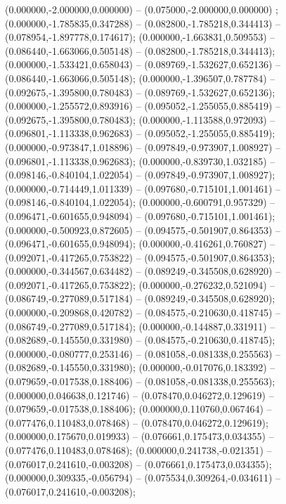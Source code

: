  (0.000000,-2.000000,0.000000) -- (0.075000,-2.000000,0.000000) ;
 (0.000000,-1.785835,0.347288) -- (0.082800,-1.785218,0.344413) -- (0.078954,-1.897778,0.174617);
 (0.000000,-1.663831,0.509553) -- (0.086440,-1.663066,0.505148) -- (0.082800,-1.785218,0.344413);
 (0.000000,-1.533421,0.658043) -- (0.089769,-1.532627,0.652136) -- (0.086440,-1.663066,0.505148);
 (0.000000,-1.396507,0.787784) -- (0.092675,-1.395800,0.780483) -- (0.089769,-1.532627,0.652136);
 (0.000000,-1.255572,0.893916) -- (0.095052,-1.255055,0.885419) -- (0.092675,-1.395800,0.780483);
 (0.000000,-1.113588,0.972093) -- (0.096801,-1.113338,0.962683) -- (0.095052,-1.255055,0.885419);
 (0.000000,-0.973847,1.018896) -- (0.097849,-0.973907,1.008927) -- (0.096801,-1.113338,0.962683);
 (0.000000,-0.839730,1.032185) -- (0.098146,-0.840104,1.022054) -- (0.097849,-0.973907,1.008927);
 (0.000000,-0.714449,1.011339) -- (0.097680,-0.715101,1.001461) -- (0.098146,-0.840104,1.022054);
 (0.000000,-0.600791,0.957329) -- (0.096471,-0.601655,0.948094) -- (0.097680,-0.715101,1.001461);
 (0.000000,-0.500923,0.872605) -- (0.094575,-0.501907,0.864353) -- (0.096471,-0.601655,0.948094);
 (0.000000,-0.416261,0.760827) -- (0.092071,-0.417265,0.753822) -- (0.094575,-0.501907,0.864353);
 (0.000000,-0.344567,0.634482) -- (0.089249,-0.345508,0.628920) -- (0.092071,-0.417265,0.753822);
 (0.000000,-0.276232,0.521094) -- (0.086749,-0.277089,0.517184) -- (0.089249,-0.345508,0.628920);
 (0.000000,-0.209868,0.420782) -- (0.084575,-0.210630,0.418745) -- (0.086749,-0.277089,0.517184);
 (0.000000,-0.144887,0.331911) -- (0.082689,-0.145550,0.331980) -- (0.084575,-0.210630,0.418745);
 (0.000000,-0.080777,0.253146) -- (0.081058,-0.081338,0.255563) -- (0.082689,-0.145550,0.331980);
 (0.000000,-0.017076,0.183392) -- (0.079659,-0.017538,0.188406) -- (0.081058,-0.081338,0.255563);
 (0.000000,0.046638,0.121746) -- (0.078470,0.046272,0.129619) -- (0.079659,-0.017538,0.188406);
 (0.000000,0.110760,0.067464) -- (0.077476,0.110483,0.078468) -- (0.078470,0.046272,0.129619);
 (0.000000,0.175670,0.019933) -- (0.076661,0.175473,0.034355) -- (0.077476,0.110483,0.078468);
 (0.000000,0.241738,-0.021351) -- (0.076017,0.241610,-0.003208) -- (0.076661,0.175473,0.034355);
 (0.000000,0.309335,-0.056794) -- (0.075534,0.309264,-0.034611) -- (0.076017,0.241610,-0.003208);
